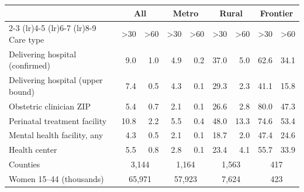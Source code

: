 \begin{tabular}{@{}lrrrrrrrr@{}}
\toprule
 & \multicolumn{2}{c}{All} & \multicolumn{2}{c}{Metro} & \multicolumn{2}{c}{Rural} & \multicolumn{2}{c}{Frontier} \\
\cmidrule(lr){2-3} \cmidrule(lr){4-5} \cmidrule(lr){6-7} \cmidrule(lr){8-9}
Care type & >30 & >60 & >30 & >60 & >30 & >60 & >30 & >60 \\
\midrule
Delivering hospital (confirmed) & 9.0 & 1.0 & 4.9 & 0.2 & 37.0 & 5.0 & 62.6 & 34.1 \\
Delivering hospital (upper bound) & 7.4 & 0.5 & 4.3 & 0.1 & 29.3 & 2.3 & 41.1 & 15.8 \\
Obstetric clinician ZIP & 5.4 & 0.7 & 2.1 & 0.1 & 26.6 & 2.8 & 80.0 & 47.3 \\
Perinatal treatment facility & 10.8 & 2.2 & 5.5 & 0.4 & 48.0 & 13.3 & 74.6 & 53.4 \\
Mental health facility, any & 4.3 & 0.5 & 2.1 & 0.1 & 18.7 & 2.0 & 47.4 & 24.6 \\
Health center & 5.5 & 0.8 & 2.8 & 0.1 & 23.4 & 4.1 & 55.7 & 33.9 \\
\midrule
Counties & \multicolumn{2}{c}{3{,}144} & \multicolumn{2}{c}{1{,}164} & \multicolumn{2}{c}{1{,}563} & \multicolumn{2}{c}{417} \\
Women 15--44 (thousands) & \multicolumn{2}{c}{65{,}971} & \multicolumn{2}{c}{57{,}923} & \multicolumn{2}{c}{7{,}624} & \multicolumn{2}{c}{423} \\
\bottomrule
\end{tabular}
